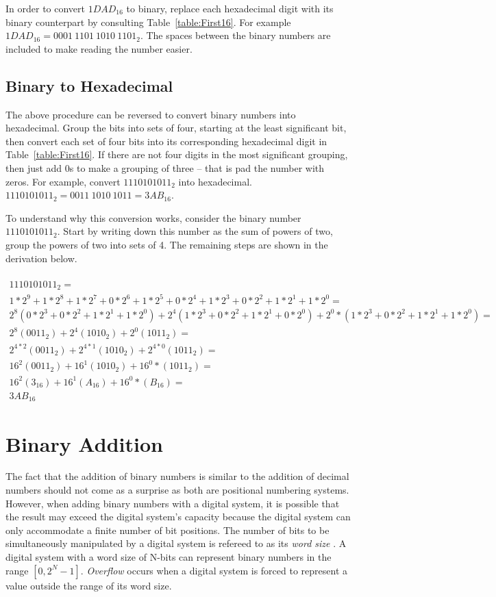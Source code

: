In order to convert $1DAD_{16}$ to binary, replace each hexadecimal
digit with its binary counterpart by consulting Table~\ref{table:First16}.
For example $1DAD_{16} = 0001~1101~1010~1101_{2}$.  The spaces between the
binary numbers are included to make reading the number easier.

\subsection{Binary to Hexadecimal}
The above procedure can be reversed to convert binary numbers into
hexadecimal.  Group the bits into sets of four, starting at the least
significant bit, then convert each set of four bits into its corresponding
hexadecimal digit in Table~\ref{table:First16}.
If there are not four digits in the most significant
grouping, then just add 0s to make a grouping of three -- that is
pad the number with zeros.  For example, convert  $1110101011_2$ into
hexadecimal. $1110101011_2 = 0011~1010~1011 = 3AB_{16}$.

To understand why this conversion works, consider the binary
number $1110101011_2$.  Start by writing down this number as the sum of
powers of two, group the powers of two into sets of 4.  The remaining steps
are shown in the derivation below.
\\ \\
{\tiny
    $
    \begin{array}{l}
        1110101011_2= \\
        1*2^9+1*2^8+1*2^7+0*2^6+1*2^5+0*2^4+1*2^3+0*2^2+1*2^1+1*2^0 = \\
        2^8(0*2^3+0*2^2+1*2^1+1*2^0) + 2^4(1*2^3+0*2^2+1*2^1+0*2^0) + 2^0*(1*2^3+0*2^2+1*2^1+1*2^0) =\\
        2^8(0011_2) + 2^4(1010_2) +  2^0(1011_2) =\\
        2^{4*2}(0011_2) + 2^{4*1}(1010_2) +  2^{4*0}(1011_2) =\\
        16^2(0011_2) + 16^1(1010_2) + 16^0*(1011_2) =\\
        16^2(3_{16}) + 16^1(A_{16}) + 16^0*(B_{16}) =\\
        3AB_{16}
    \end{array}$
}

\section{Binary Addition}
\label{chapter:numberingAddition}
\label{page:addition}
The fact that the addition of binary numbers is similar to the
addition of decimal numbers should not come as a surprise as both
are positional numbering systems. However, when adding binary numbers
with a digital system, it is possible that the result may exceed the
digital system's capacity because the digital system can only accommodate a
finite number of bit positions.  The number of bits to be
simultaneously manipulated by a digital system is refereed to as
its \textit{ word size} .  A digital system with a
word size of N-bits can represent binary numbers in the range
$[0, 2^N-1]$.  \textit{ Overflow}  occurs when a
digital system is forced to represent a value outside the range
of its word size.

